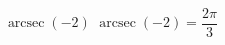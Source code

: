  {$\operatorname{arcsec} \left( -2 \right)$ }
{ $\operatorname{arcsec} \left( -2 \right) = \dfrac{2\pi}{3}$ }
